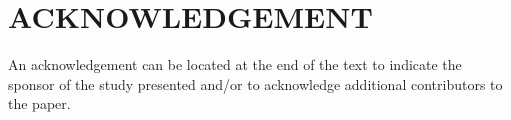 \section*{ACKNOWLEDGEMENT}
An acknowledgement can be located at the end of the text to indicate the sponsor of the study presented and/or to acknowledge additional contributors to the paper.

